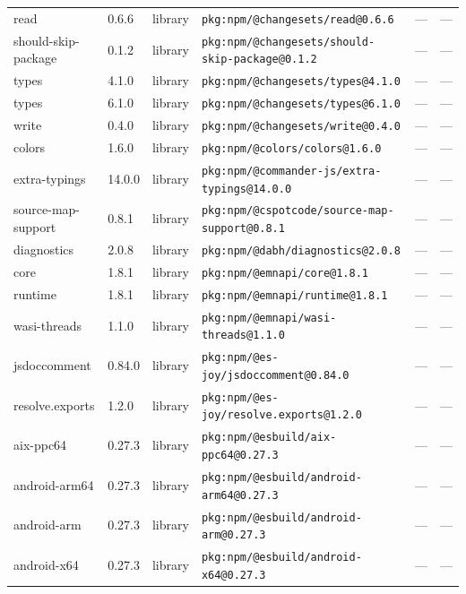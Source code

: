 \documentclass[11pt,a4paper]{article}
\begin{document}
\begin{longtable}{|p{4cm}|p{2cm}|p{1.6cm}|p{5cm}|p{1.5cm}|p{3.5cm}|}
\raggedright read & 0.6.6 & library & \small\texttt{pkg:npm/@changesets/read@0.6.6} & — & \small — \\
\raggedright should-skip-package & 0.1.2 & library & \small\texttt{pkg:npm/@changesets/should-skip-package@0.1.2} & — & \small — \\
\raggedright types & 4.1.0 & library & \small\texttt{pkg:npm/@changesets/types@4.1.0} & — & \small — \\
\raggedright types & 6.1.0 & library & \small\texttt{pkg:npm/@changesets/types@6.1.0} & — & \small — \\
\raggedright write & 0.4.0 & library & \small\texttt{pkg:npm/@changesets/write@0.4.0} & — & \small — \\
\raggedright colors & 1.6.0 & library & \small\texttt{pkg:npm/@colors/colors@1.6.0} & — & \small — \\
\raggedright extra-typings & 14.0.0 & library & \small\texttt{pkg:npm/@commander-js/extra-typings@14.0.0} & — & \small — \\
\raggedright source-map-support & 0.8.1 & library & \small\texttt{pkg:npm/@cspotcode/source-map-support@0.8.1} & — & \small — \\
\raggedright diagnostics & 2.0.8 & library & \small\texttt{pkg:npm/@dabh/diagnostics@2.0.8} & — & \small — \\
\raggedright core & 1.8.1 & library & \small\texttt{pkg:npm/@emnapi/core@1.8.1} & — & \small — \\
\raggedright runtime & 1.8.1 & library & \small\texttt{pkg:npm/@emnapi/runtime@1.8.1} & — & \small — \\
\raggedright wasi-threads & 1.1.0 & library & \small\texttt{pkg:npm/@emnapi/wasi-threads@1.1.0} & — & \small — \\
\raggedright jsdoccomment & 0.84.0 & library & \small\texttt{pkg:npm/@es-joy/jsdoccomment@0.84.0} & — & \small — \\
\raggedright resolve.exports & 1.2.0 & library & \small\texttt{pkg:npm/@es-joy/resolve.exports@1.2.0} & — & \small — \\
\raggedright aix-ppc64 & 0.27.3 & library & \small\texttt{pkg:npm/@esbuild/aix-ppc64@0.27.3} & — & \small — \\
\raggedright android-arm64 & 0.27.3 & library & \small\texttt{pkg:npm/@esbuild/android-arm64@0.27.3} & — & \small — \\
\raggedright android-arm & 0.27.3 & library & \small\texttt{pkg:npm/@esbuild/android-arm@0.27.3} & — & \small — \\
\raggedright android-x64 & 0.27.3 & library & \small\texttt{pkg:npm/@esbuild/android-x64@0.27.3} & — & \small — \\

\end{longtable}
\end{document}
